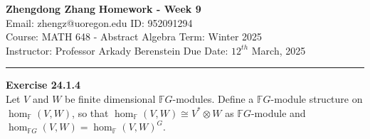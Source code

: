 \documentclass[a4paper, 12pt]{article}
\newenvironment{problem}[2][Exercise]
    { \begin{mdframed}[backgroundcolor=gray!20] \textbf{#1 #2} \\}
    {  \end{mdframed}}
\begin{document}
\noindent
\large\textbf{Zhengdong Zhang} \hfill \textbf{Homework - Week 9}   \\
Email: zhengz@uoregon.edu \hfill ID: 952091294 \\
\normalsize Course: MATH 648 - Abstract Algebra  \hfill Term: Winter 2025\\
Instructor: Professor Arkady Berenstein \hfill Due Date: $12^{th}$ March, 2025 \\
\noindent\rule{7in}{2.8pt}
\begin{problem}{24.1.4}
Let \(V\) and \(W\) be finite dimensional \(\mathbb{F}G\)-modules. Define a \(\mathbb{F}G\)-module structure on \(\hom_\mathbb{F}(V,W)\), so that \(\hom_\mathbb{F}(V,W)\cong V^{*}\otimes W\) as 
\(\mathbb{F}G\)-module and \(\hom_{\mathbb{F}G}(V,W)=\hom_\mathbb{F}(V,W)^G\). 
\end{problem}
\end{document}
